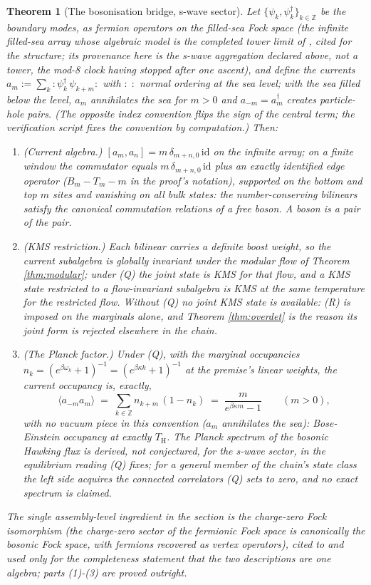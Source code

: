 \documentclass[11pt]{article}
\newtheorem{theorem}{Theorem}[section]
\theoremstyle{definition}
\renewcommand{\TH}{T_{\mathrm{H}}} %
\newcommand{\id}{\mathrm{id}}
\begin{document}
\begin{theorem}[The bosonisation bridge, s-wave sector]\label{thm:bosonisation}
Let $\{\psi_k, \psi^\dagger_k\}_{k \in \mathbb{Z}}$ be the boundary modes, as fermion operators on the filled-sea Fock space (the infinite filled-sea array whose algebraic model is the completed tower limit of \cite[Thm.~5.6]{ButlerT3}, cited for the structure; its provenance here is the s-wave aggregation declared above, not a tower, the mod-8 clock having stopped after one ascent), and define the currents $a_m := \sum_k :\psi^\dagger_k\,\psi_{k+m}:$ with $:\;:$ normal ordering at the sea level; with the sea filled below the level, $a_m$ annihilates the sea for $m > 0$ and $a_{-m} = a_m^{\dagger}$ creates particle-hole pairs. (The opposite index convention flips the sign of the central term; the verification script fixes the convention by computation.) Then:
\begin{enumerate}
\item (Current algebra.) $[a_m, a_n] = m\,\delta_{m+n,0}\,\id$ on the infinite array; on a finite window the commutator equals $m\,\delta_{m+n,0}\,\id$ plus an \emph{exactly identified} edge operator ($B_m - T_m - m$ in the proof's notation), supported on the bottom and top $m$ sites and vanishing on all bulk states: the number-conserving bilinears satisfy the canonical commutation relations of a free boson. A boson is a pair of the pair.
\item (KMS restriction.) Each bilinear carries a definite boost weight, so the current subalgebra is globally invariant under the modular flow of Theorem \ref{thm:modular}; under (Q) the joint state is KMS for that flow, and a KMS state restricted to a flow-invariant subalgebra is KMS at the same temperature for the restricted flow. Without (Q) no joint KMS state is available: (R) is imposed on the marginals alone, and Theorem \ref{thm:overdet} is the reason its joint form is rejected elsewhere in the chain.
\item (The Planck factor.) Under (Q), with the marginal occupancies $n_k = (e^{\beta\omega_k} + 1)^{-1} = (e^{\beta\kappa k} + 1)^{-1}$ at the premise's linear weights, the current occupancy is, exactly,
\[
\langle a_{-m} a_m \rangle \;=\; \sum_{k \in \mathbb{Z}} n_{k+m}\,(1 - n_k) \;=\; \frac{m}{e^{\beta\kappa m} - 1} \qquad (m > 0) ,
\]
with no vacuum piece in this convention ($a_m$ annihilates the sea): Bose-Einstein occupancy at exactly $\TH$. The Planck spectrum of the bosonic Hawking flux is derived, not conjectured, for the s-wave sector, in the equilibrium reading (Q) fixes; for a general member of the chain's state class the left side acquires the connected correlators (Q) sets to zero, and no exact spectrum is claimed.
\end{enumerate}
The single assembly-level ingredient in the section is the charge-zero Fock isomorphism (the charge-zero sector of the fermionic Fock space is canonically the bosonic Fock space, with fermions recovered as vertex operators), cited to \cite{PressleySegal1986} and used only for the completeness statement that the two descriptions are one algebra; parts (1)-(3) are proved outright.
\end{theorem}
\end{document}
